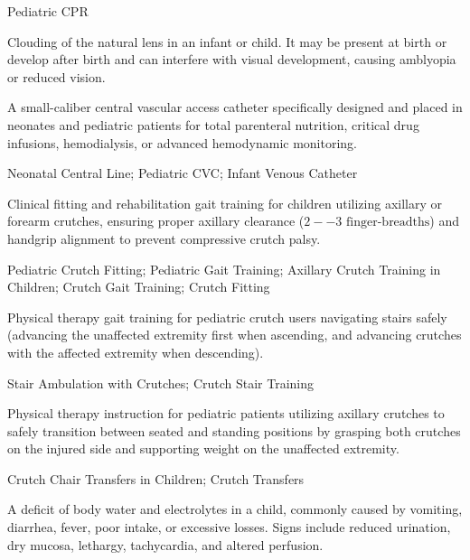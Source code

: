 \synonyms
Pediatric CPR

 Clouding of the natural lens in an infant or child. It may be present at birth or develop after birth and can interfere with visual development, causing amblyopia or reduced vision.

 A small-caliber central vascular access catheter specifically designed and placed in neonates and pediatric patients for total parenteral nutrition, critical drug infusions, hemodialysis, or advanced hemodynamic monitoring.

\synonyms
Neonatal Central Line; Pediatric CVC; Infant Venous Catheter

 Clinical fitting and rehabilitation gait training for children utilizing axillary or forearm crutches, ensuring proper axillary clearance ($2--3\text{ finger-breadths}$) and handgrip alignment to prevent compressive crutch palsy.

\synonyms
Pediatric Crutch Fitting; Pediatric Gait Training; Axillary Crutch Training in Children; Crutch Gait Training; Crutch Fitting

 Physical therapy gait training for pediatric crutch users navigating stairs safely (advancing the unaffected extremity first when ascending, and advancing crutches with the affected extremity when descending).

\synonyms
Stair Ambulation with Crutches; Crutch Stair Training

 Physical therapy instruction for pediatric patients utilizing axillary crutches to safely transition between seated and standing positions by grasping both crutches on the injured side and supporting weight on the unaffected extremity.

\synonyms
Crutch Chair Transfers in Children; Crutch Transfers

 A deficit of body water and electrolytes in a child, commonly caused by vomiting, diarrhea, fever, poor intake, or excessive losses. Signs include reduced urination, dry mucosa, lethargy, tachycardia, and altered perfusion.

